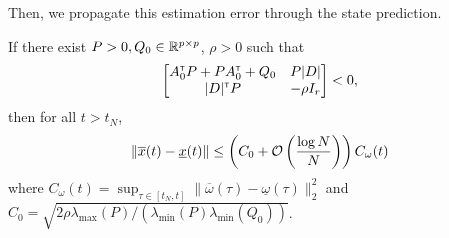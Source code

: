 \documentclass{article}
\begin{document}
Then, we propagate this estimation error through the state prediction.

\begin{lemma}
If there exist $P>0,Q_0\in\mathbb{R}^{p\times p}$, $\rho>0$ such that
\begin{align*}
\begin{bmatrix}
A_0^{\mathsf{\scriptscriptstyle T}} P + P A_0^{\mathsf{\scriptscriptstyle T}} + Q_0 & P|D|  \\
|D|^{\mathsf{\scriptscriptstyle T}} P & -\rho I_r \\
\end{bmatrix}< 0,
\end{align*}
then for all $t> t_N$,
\[\|\overline{x}(t) - \underline{x}(t)\| \leq \left(C_0 + \mathcal{O}\left({\frac{\log N}{N}} \right)\right)C_\omega(t) \]
where $C_\omega(t) = \sup_{\tau\in[t_N,t]} \|\overline{\omega}(\tau) - \underline{\omega}(\tau)\|_2^2$ and $C_0 = \sqrt{{2\rho\lambda_{\max}(P)}/({\lambda_{\min}(P)\lambda_{\min}(Q_0)})}$.
\end{lemma}
\end{document}
